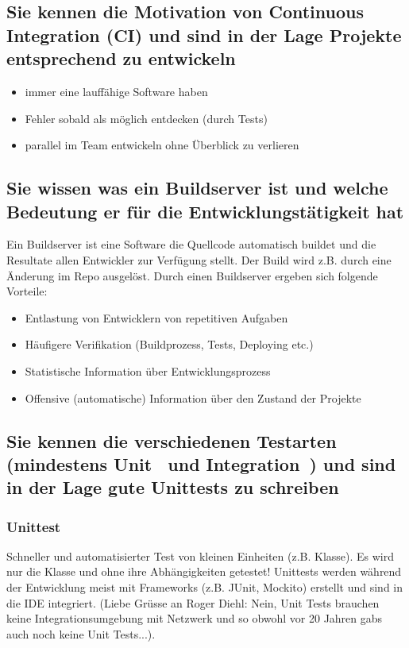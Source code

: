 \subsection{Sie kennen die Motivation von Continuous Integration (CI) und sind in der Lage Projekte entsprechend zu entwickeln}

\begin{itemize}
	\item immer eine lauffähige Software haben
	\item Fehler sobald als möglich entdecken (durch Tests)
	\item parallel im Team entwickeln ohne Überblick zu verlieren
\end{itemize}

\subsection{Sie wissen was ein Buildserver ist und welche Bedeutung er für die Entwicklungstätigkeit hat}

Ein Buildserver ist eine Software die Quellcode automatisch buildet und die Resultate allen Entwickler zur Verfügung stellt. Der Build wird z.B. durch eine Änderung im Repo ausgelöst. Durch einen Buildserver ergeben sich folgende Vorteile:

\begin{itemize}
	\item Entlastung von Entwicklern von repetitiven Aufgaben
	\item Häufigere Verifikation (Buildprozess, Tests, Deploying etc.)
	\item Statistische Information über Entwicklungsprozess
	\item Offensive (automatische) Information über den Zustand der Projekte
\end{itemize}

\subsection{Sie kennen die verschiedenen Testarten (mindestens Unit~ und Integration~) und sind in der Lage gute Unittests zu schreiben}

\subsubsection{Unittest}

Schneller und automatisierter Test von kleinen Einheiten (z.B. Klasse). Es wird nur die Klasse und ohne ihre Abhängigkeiten getestet! Unittests werden während der Entwicklung meist mit Frameworks (z.B. JUnit, Mockito) erstellt und sind in die IDE integriert. (Liebe Grüsse an Roger Diehl: Nein, Unit Tests brauchen keine Integrationsumgebung mit Netzwerk und so obwohl vor 20 Jahren gabs auch noch keine Unit Tests...).

